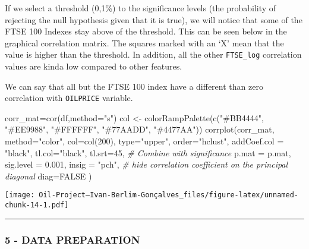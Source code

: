 \documentclass[
]{article}
\newenvironment{Shaded}{\begin{snugshade}}{\end{snugshade}}
\newcommand{\AttributeTok}[1]{\textcolor[rgb]{0.77,0.63,0.00}{#1}}
\newcommand{\CommentTok}[1]{\textcolor[rgb]{0.56,0.35,0.01}{\textit{#1}}}
\newcommand{\ConstantTok}[1]{\textcolor[rgb]{0.00,0.00,0.00}{#1}}
\newcommand{\DecValTok}[1]{\textcolor[rgb]{0.00,0.00,0.81}{#1}}
\newcommand{\FloatTok}[1]{\textcolor[rgb]{0.00,0.00,0.81}{#1}}
\newcommand{\FunctionTok}[1]{\textcolor[rgb]{0.00,0.00,0.00}{#1}}
\newcommand{\NormalTok}[1]{#1}
\newcommand{\OtherTok}[1]{\textcolor[rgb]{0.56,0.35,0.01}{#1}}
\newcommand{\StringTok}[1]{\textcolor[rgb]{0.31,0.60,0.02}{#1}}
\begin{document}
If we select a threshold (0,1\%) to the significance levels (the
probability of rejecting the null hypothesis given that it is true), we
will notice that some of the FTSE 100 Indexes stay above of the
threshold. This can be seen below in the graphical correlation matrix.
The squares marked with an `X' mean that the value is higher than the
threshold. In addition, all the other \texttt{FTSE\_log} correlation
values are kinda low compared to other features.

We can say that all but the FTSE 100 index have a different than zero
correlation with \texttt{OILPRICE} variable.

\begin{Shaded}
\begin{Highlighting}[]
\NormalTok{corr\_mat}\OtherTok{=}\FunctionTok{cor}\NormalTok{(df,}\AttributeTok{method=}\StringTok{"s"}\NormalTok{)}
\NormalTok{col }\OtherTok{\textless{}{-}} \FunctionTok{colorRampPalette}\NormalTok{(}\FunctionTok{c}\NormalTok{(}\StringTok{"\#BB4444"}\NormalTok{, }\StringTok{"\#EE9988"}\NormalTok{, }\StringTok{"\#FFFFFF"}\NormalTok{, }\StringTok{"\#77AADD"}\NormalTok{, }\StringTok{"\#4477AA"}\NormalTok{))}
\FunctionTok{corrplot}\NormalTok{(corr\_mat, }\AttributeTok{method=}\StringTok{"color"}\NormalTok{, }\AttributeTok{col=}\FunctionTok{col}\NormalTok{(}\DecValTok{200}\NormalTok{),  }
         \AttributeTok{type=}\StringTok{"upper"}\NormalTok{, }\AttributeTok{order=}\StringTok{"hclust"}\NormalTok{, }
         \AttributeTok{addCoef.col =} \StringTok{"black"}\NormalTok{,}
         \AttributeTok{tl.col=}\StringTok{"black"}\NormalTok{, }\AttributeTok{tl.srt=}\DecValTok{45}\NormalTok{,}
         \CommentTok{\# Combine with significance}
         \AttributeTok{p.mat =}\NormalTok{ p.mat, }\AttributeTok{sig.level =} \FloatTok{0.001}\NormalTok{, }\AttributeTok{insig =} \StringTok{"pch"}\NormalTok{, }
         \CommentTok{\# hide correlation coefficient on the principal diagonal}
         \AttributeTok{diag=}\ConstantTok{FALSE} 
\NormalTok{         )}
\end{Highlighting}
\end{Shaded}

\texttt{[image: Oil-Project---Ivan-Berlim-Gonçalves\_files/figure-latex/unnamed-chunk-14-1.pdf]}

\begin{center}\rule{0.5\linewidth}{0.5pt}\end{center}

\hypertarget{data-preparation-1}{%
\subsubsection{5 - DATA PREPARATION}\label{data-preparation-1}}
\end{document}

